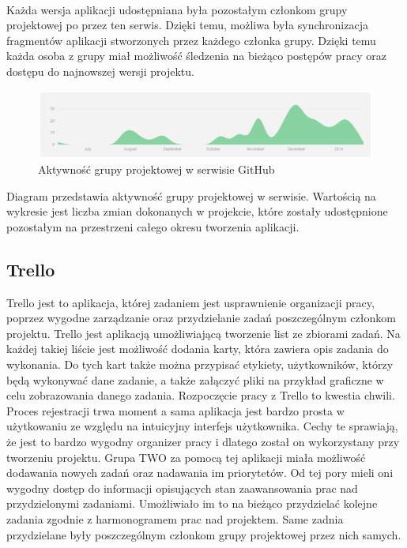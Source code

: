 \paragraph{}
Każda wersja aplikacji udostępniana była pozostałym członkom grupy projektowej po przez ten serwis. Dzięki temu, możliwa była synchronizacja fragmentów aplikacji stworzonych przez każdego członka grupy. Dzięki temu każda osoba z grupy miał możliwość śledzenia na bieżąco postępów pracy oraz dostępu do najnowszej wersji projektu. 
\begin{figure}[h]
	\centering
	\includegraphics[width=1.00\textwidth]{images/git.png}
	\caption{Aktywność grupy projektowej w serwisie GitHub}
\end{figure}

Diagram przedstawia aktywność grupy projektowej w serwisie. Wartością na wykresie jest liczba zmian dokonanych w projekcie, które zostały udostępnione pozostałym na przestrzeni całego  okresu tworzenia aplikacji. 

\subsection{Trello}
Trello jest to aplikacja, której zadaniem jest usprawnienie organizacji pracy, poprzez wygodne zarządzanie oraz przydzielanie zadań poszczególnym członkom projektu. Trello jest aplikacją umożliwiającą tworzenie list ze zbiorami zadań. Na każdej takiej liście jest możliwość dodania karty, która zawiera opis zadania do wykonania. Do tych kart także można przypisać etykiety, użytkowników, którzy będą wykonywać dane zadanie, a także załączyć pliki  na przykład graficzne w celu zobrazowania danego zadania. Rozpoczęcie pracy z Trello  to kwestia chwili. Proces rejestracji trwa moment a sama aplikacja jest bardzo prosta w użytkowaniu ze względu na intuicyjny interfejs użytkownika. Cechy te sprawiają, że jest to bardzo wygodny organizer pracy i dlatego został on wykorzystany przy tworzeniu projektu. Grupa TWO za pomocą tej aplikacji miała możliwość dodawania nowych zadań oraz nadawania im priorytetów. Od tej pory mieli oni wygodny dostęp do informacji opisujących stan zaawansowania prac nad przydzielonymi zadaniami. Umożliwiało im to na bieżąco przydzielać kolejne zadania zgodnie z harmonogramem prac nad projektem. Same zadnia przydzielane były poszczególnym członkom grupy projektowej przez nich samych. 


